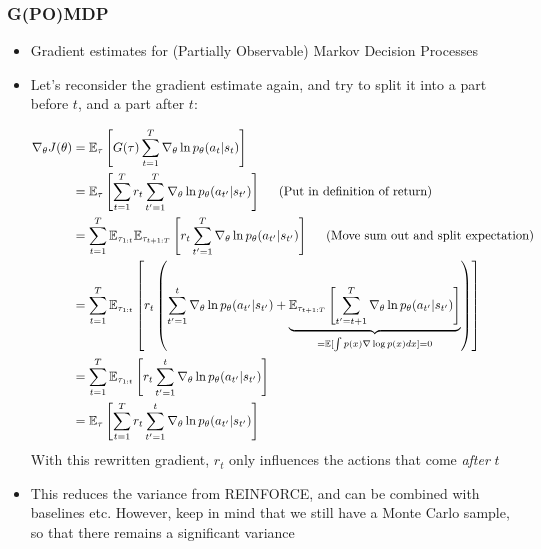 \subsubsection{G(PO)MDP}
\begin{itemize}
	\item Gradient estimates for (Partially Observable) Markov Decision Processes
	\item Let's reconsider the gradient estimate again, and try to split it into a part before $t$, and a part after $t$:
	
	\begin{equation*}
		\begin{split}
			\nabla_{\theta}J(\theta) & =  \mathbb{E}_{\tau}\left[G(\tau)\sum_{t=1}^{T}\nabla_{\theta} \ln p_{\theta}(a_t|s_t)\right]\\
			& = \mathbb{E}_{\tau}\left[\sum_{t=1}^{T} r_t \sum_{t'=1}^{T}\nabla_{\theta} \ln p_{\theta}(a_{t'}|s_{t'})\right]\hspace{5mm}\text{(Put in definition of return)}\\
			& = \sum_{t=1}^{T} \mathbb{E}_{\tau_{1:t}}\mathbb{E}_{\tau_{t+1:T}}\left[r_t \sum_{t'=1}^{T}\nabla_{\theta} \ln p_{\theta}(a_{t'}|s_{t'})\right]\hspace{5mm}\text{(Move sum out and split expectation)}\\
			& = \sum_{t=1}^{T} \mathbb{E}_{\tau_{1:t}}\left[r_t \left(\sum_{t'=1}^{t}\nabla_{\theta} \ln p_{\theta}(a_{t'}|s_{t'}) + \underbrace{\mathbb{E}_{\tau_{t+1:T}}\left[\sum_{t'=t+1}^{T}\nabla_{\theta} \ln p_{\theta}(a_{t'}|s_{t'})\right]}_{=\mathbb{E}[\int p(x)\nabla\log p(x)dx]=0}\right)\right]\\
			& = \sum_{t=1}^{T} \mathbb{E}_{\tau_{1:t}}\left[r_t \sum_{t'=1}^{t}\nabla_{\theta} \ln p_{\theta}(a_{t'}|s_{t'}) \right]\\
			& = \mathbb{E}_{\tau}\left[\sum_{t=1}^{T}  r_t \sum_{t'=1}^{t}\nabla_{\theta} \ln p_{\theta}(a_{t'}|s_{t'}) \right]
		\end{split}
	\end{equation*}
	With this rewritten gradient, $r_t$ only influences the actions that come \textit{after} $t$
	\item This reduces the variance from REINFORCE, and can be combined with baselines etc. However, keep in mind that we still have a Monte Carlo sample, so that there remains a significant variance
\end{itemize}
